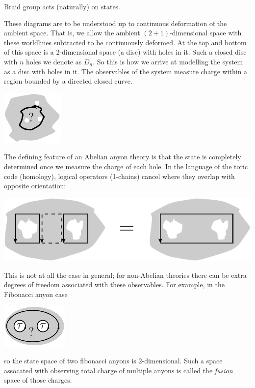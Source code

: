 \documentclass[aps, prl, letterpaper, twocolumn, superscriptaddress, notitlepage, 10pt]{revtex4-1}
\begin{document}
Braid group acts (naturally) on states.

These diagrams are to be understood up to
continuous deformation of the ambient space.
That is, we allow the ambient $(2+1)$-dimensional
space with these worldlines subtracted to be continuously
deformed.
At the top and bottom of this space is 
a $2$-dimensional space (a disc) with holes in it.
Such a closed disc with $n$ holes we denote as $D_n.$
So this is how we arrive at modelling the system as
a disc with holes in it.
The observables of the system measure charge within
a region bounded by a directed closed curve.
\begin{center}
\includegraphics[]{pic-observable.pdf}
\end{center}

The defining feature of an Abelian anyon theory
is that the state is completely determined once
we measure the charge of each hole.
In the language of the toric code (homology),
logical operators (1-chains)
cancel where they overlap
with opposite orientation:
\begin{center}
\includegraphics[width=0.7\columnwidth]{pic-abelian.pdf}
\end{center}

This is not at all the case in general;
for non-Abelian theories there can be extra
degrees of freedom associated with these
observables. For example, in
the Fibonacci anyon case
\begin{center}
\includegraphics[]{pic-fusion.pdf}
\end{center}
so the state space of two fibonacci anyons
is $2$-dimensional.
Such a space assocated with observing total charge
of multiple anyons is called the \emph{fusion} space
of those charges.
\end{document}
